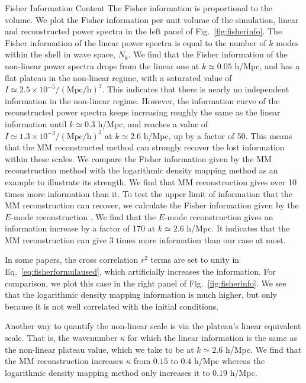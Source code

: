 \begin{section}{Fisher Information Content}
  The Fisher information is proportional to the volume. 
  We plot the Fisher information per unit volume of the
  simulation, linear and reconstructed power spectra in the left panel of 
  Fig.~\ref{fig:fisherinfo}. The Fisher information of the linear 
  power spectra is equal to the number of $k$ modes within the shell in 
  wave space, $N_k$. We find that the Fisher information of the
  non-linear power spectra drops from the linear one at
  $k \simeq 0.05$ h/Mpc, and has a flat plateau in the non-linear
  regime, with a saturated value of
  $I \simeq 2.5 \times 10^{-5}/\mathrm{(Mpc/h)}^3$.  This indicates
  that there is nearly no independent information in the non-linear
  regime.  However, the information curve of the reconstructed power
  spectra keeps increasing roughly the same as the linear information
  until $k\simeq 0.3$ h/Mpc, and reaches a value of 
  $I \simeq 1.3 \times 10^{-3}/\mathrm{(Mpc/h)}^3$ at $k \simeq 2.6$ h/Mpc, up by a
  factor of 50.  
  This means that the MM reconstructed method can
  strongly recover the lost information within these scales.  
  We compare the Fisher information given by the MM reconstruction method
  with the logarithmic density mapping method \cite{bib:Mark2009} as
  an example to illustrate its strength. We find that MM
  reconstruction gives over 10 times more information than it.  
  To test the upper limit of information that the MM reconstruction can recover, 
  we calculate the Fisher information given by the $E$-mode reconstruction \cite{bib:Yu2016}. 
  We find that the $E$-mode reconstruction gives an information increase by a factor of 170 at 
  $k \simeq 2.6$ h/Mpc. It indicates that the MM reconstruction can give 3 times more 
  information than our case at most. 

  In some papers, the cross correlation $r^2$ terms are set
  to unity in Eq.~\ref{eq:fisherformulaused}, which artificially
  increases the information.  For comparison, we plot this case in the right panel of 
  Fig.~\ref{fig:fisherinfo}.  We see that the logarithmic density
  mapping information is much higher, but only because it is not well
  correlated with the initial conditions.

  Another way to quantify the non-linear scale is via the plateau's linear equivalent scale.  
  That is, the wavenumber $\kappa$ for which the linear information is the same as the non-linear 
  plateau value, which we take to be at $k \simeq 2.6$ h/Mpc.  We find that the MM reconstruction 
  increases $\kappa$ from $0.15$ to $0.4$ h/Mpc whereas the logarithmic density 
  mapping method only increases it to $0.19$ h/Mpc.


\end{section}
